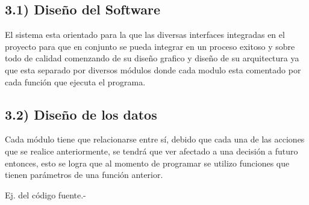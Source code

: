 \documentclass{article} %
\begin{document}
\subsection{           3.1) Dise\~{n}o del Software}

\noindent El sistema esta orientado para la que las diversas interfaces integradas en el proyecto para que en conjunto se pueda integrar en un proceso exitoso y sobre todo de calidad comenzando de su dise\~{n}o grafico y dise\~{n}o de su arquitectura ya que esta separado por diversos m\'{o}dulos donde cada modulo esta comentado por cada funci\'{o}n que ejecuta el programa.


\subsection{    3.2) Dise\~{n}o de los datos}

\noindent Cada m\'{o}dulo tiene que relacionarse entre s\'{i}, debido que cada una de las acciones que se realice anteriormente, se tendr\'{a} que ver afectado a una decisi\'{o}n a futuro entonces, esto se logra que al momento de programar se utilizo funciones que tienen par\'{a}metros de una funci\'{o}n anterior.

\noindent Ej. del c\'{o}digo fuente.-
\end{document}
